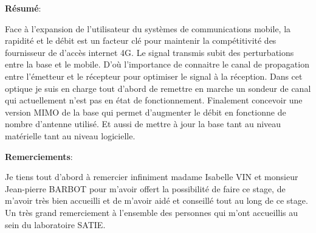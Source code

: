 \documentclass[a4paper, 12pt]{report}
\newcommand{\alal}
{\linebreak
\linebreak
\linebreak
\linebreak}
\begin{document}
\fancyhead[]{}
\fancyhead[R]{\textcolor{lightgray}{Introdution}}
\begin{Huge}
\textbf{Résumé}:\\
\end{Huge}
\break


Face à l'expansion de l'utilisateur du systèmes de communications mobile, la rapidité et le débit est un facteur clé pour maintenir la compétitivité des fournisseur de d'accès internet 4G. Le signal transmis subit des perturbations entre la base et le mobile. D'où l'importance de connaitre le canal de propagation entre l'émetteur et le récepteur pour optimiser le signal à la réception. Dans cet optique je suis en charge tout d'abord de remettre en marche un sondeur de canal qui actuellement n'est pas en état de fonctionnement. Finalement concevoir une version MIMO de la base qui permet d'augmenter le débit en fonctionne de nombre d'antenne utilisé. Et aussi de mettre à jour la base tant au niveau matérielle tant au niveau logicielle.
\\
\alal
\alal


\begin{Huge}
\textbf{Remerciements}:\\
\end{Huge}
\break

Je tiens tout d'abord à remercier infiniment madame Isabelle VIN et monsieur Jean-pierre BARBOT pour m'avoir offert la possibilité de faire ce stage, de m'avoir très bien accueilli et de m'avoir aidé et conseillé tout au long de ce stage.\\
Un très grand remerciement à l'ensemble des personnes qui m'ont accueillis au sein du laboratoire SATIE.



\newpage
\fancyhead[R]{\textcolor{lightgray}{\leftmark}}

\newpage

\newpage

\newpage
\end{document}
